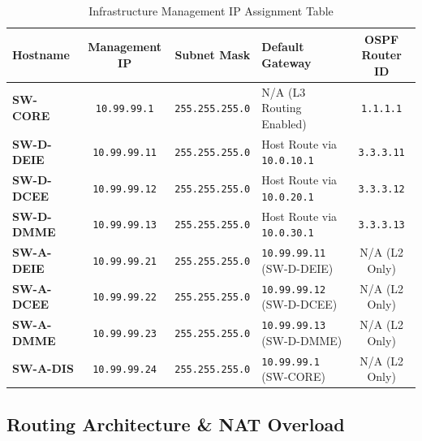 \documentclass[11pt,a4paper]{article}
\begin{document}
\begin{table}[htbp]
\centering
\caption{Infrastructure Management IP Assignment Table}
\label{tab:mgmt_ips}
\small
\begin{tabularx}{\textwidth}{@{}l c c L c@{}}
\toprule
\textbf{Hostname} & \textbf{Management IP} & \textbf{Subnet Mask} & \textbf{Default Gateway} & \textbf{OSPF Router ID} \\
\midrule
\textbf{SW-CORE} & \texttt{10.99.99.1} & \texttt{255.255.255.0} & N/A (L3 Routing Enabled) & \texttt{1.1.1.1} \\
\textbf{SW-D-DEIE} & \texttt{10.99.99.11} & \texttt{255.255.255.0} & Host Route via \texttt{10.0.10.1} & \texttt{3.3.3.11} \\
\textbf{SW-D-DCEE} & \texttt{10.99.99.12} & \texttt{255.255.255.0} & Host Route via \texttt{10.0.20.1} & \texttt{3.3.3.12} \\
\textbf{SW-D-DMME} & \texttt{10.99.99.13} & \texttt{255.255.255.0} & Host Route via \texttt{10.0.30.1} & \texttt{3.3.3.13} \\
\textbf{SW-A-DEIE} & \texttt{10.99.99.21} & \texttt{255.255.255.0} & \texttt{10.99.99.11} (SW-D-DEIE) & N/A (L2 Only) \\
\textbf{SW-A-DCEE} & \texttt{10.99.99.22} & \texttt{255.255.255.0} & \texttt{10.99.99.12} (SW-D-DCEE) & N/A (L2 Only) \\
\textbf{SW-A-DMME} & \texttt{10.99.99.23} & \texttt{255.255.255.0} & \texttt{10.99.99.13} (SW-D-DMME) & N/A (L2 Only) \\
\textbf{SW-A-DIS} & \texttt{10.99.99.24} & \texttt{255.255.255.0} & \texttt{10.99.99.1} (SW-CORE) & N/A (L2 Only) \\
\bottomrule
\end{tabularx}
\end{table}

\subsection{Routing Architecture \& NAT Overload}
\end{document}
